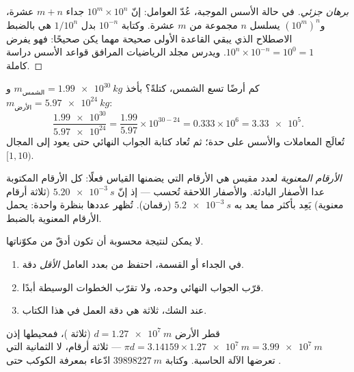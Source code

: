 \begin{proof}[برهان جزئي]
في حالة الأسس الموجبة، عُدّ العوامل: إنّ $10^{m} \times 10^{n}$ جداء
$m + n$ عشرة، و$(10^m)^n$ يسلسل $n$ مجموعة من $m$ عشرة.
وكتابة $10^{-n}$ بدل $1/10^{n}$ هي بالضبط الاصطلاح الذي
يبقي القاعدة الأولى صحيحة مهما يكن  صحيحًا: فهو يفرض
$10^{n} \times 10^{-n} = 10^{0} = 1$. ويدرس مجلد الرياضيات
المرافق قواعد الأسس دراسة كاملة.
\end{proof}

\begin{example}\label{ex:g10:orders-of-magnitude:scinot}
كم أرضًا تسع الشمس، كتلةً؟ بأخذ
$m_{\text{الشمس}} = \qty{1.99e30}{kg}$ و
$m_{\text{الأرض}} = \qty{5.97e24}{kg}$:
\[
\frac{\num{1.99e30}}{\num{5.97e24}}
= \frac{1.99}{5.97} \times 10^{30-24}
= 0.333 \times 10^{6}
= \num{3.33e5}.
\]
تُعالَج المعاملات والأسس على حدة؛ ثم تُعاد كتابة الجواب النهائي
حتى يعود  إلى المجال $[1, 10)$.
\end{example}

\begin{definition}\label{def:g10:orders-of-magnitude:sigfig}
\emph{الأرقام المعنوية} لعدد مقيس هي
الأرقام التي يضمنها القياس فعلًا: كل الأرقام
المكتوبة عدا الأصفار البادئة. والأصفار اللاحقة تُحسب ---
إذ إنّ $\qty{5.20e-3}{s}$ (ثلاثة أرقام معنوية)
يَعِد بأكثر مما يعد به $\qty{5.2e-3}{s}$ (رقمان).  تُظهر
عددها بنظرة واحدة:  يحمل الأرقام المعنوية
بالضبط.
\end{definition}

\begin{method}\label{met:g10:orders-of-magnitude:sigfig}
لا يمكن لنتيجة محسوبة أن تكون أدقّ من مكوّناتها.
\begin{enumerate}
  \item في الجداء أو القسمة، احتفظ من  بعدد
        العامل \emph{الأقل} دقة.
  \item قرّب الجواب النهائي وحده، ولا تقرّب الخطوات الوسيطة أبدًا.
  \item عند الشك، ثلاثة  هي دقة العمل
        في هذا الكتاب.
\end{enumerate}
\end{method}

\begin{example}\label{ex:g10:orders-of-magnitude:sigfig}
قطر الأرض $d = \qty{1.27e7}{m}$ (ثلاثة )،
فمحيطها إذن
$\pi d = \num{3.14159} \times \qty{1.27e7}{m} = \qty{3.99e7}{m}$ ---
ثلاثة أرقام، لا الثمانية التي تعرضها الآلة الحاسبة. وكتابة
$\qty{39898227}{m}$ ادّعاء بمعرفة الكوكب حتى .
\end{example}

